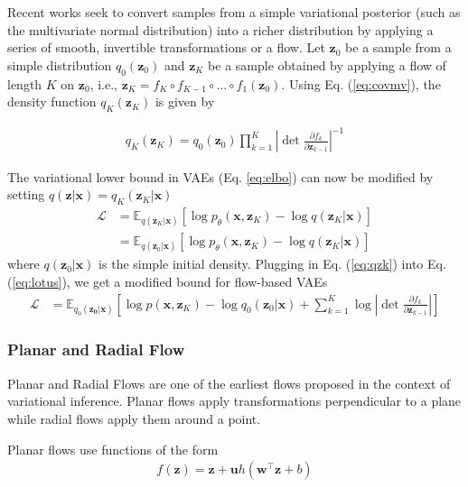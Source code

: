 \documentclass[runningheads]{llncs}
\begin{document}
Recent works seek to convert samples from a simple variational posterior (such as the multivariate normal distribution) into a richer distribution by applying a series of smooth, invertible transformations or a flow. Let $\mathbf{z}_0$ be a sample from a simple distribution $q_0(\mathbf{z}_0)$ and $\mathbf{z}_K$ be a sample obtained by applying a flow of length $K$ on $\mathbf{z}_0$, i.e., $\mathbf{z}_K = f_K \circ f_{K-1} \circ \dots \circ f_1 (\mathbf{z}_0)$. Using Eq. (\ref{eq:covmv}), the density function $q_K(\mathbf{z}_K)$ is given by

\begin{align}
q_K(\mathbf{z}_K) = q_0(\mathbf{z}_0)\prod_{k=1}^K\left|\det \frac{\partial f_k}{\partial \mathbf{z}_{k-1}}\right|^{-1}\label{eq:qzk}
\end{align}

The variational lower bound in VAEs (Eq. \ref{eq:elbo}) can now be modified by setting $q(\mathbf{z}|\mathbf{x}) = q_K(\mathbf{z}_K|\mathbf{x})$
\begin{align}
\mathcal{L} &= \mathbb{E}_{q(\mathbf{z}_K|\mathbf{x})}\left[\log p_\theta(\mathbf{x}, \mathbf{z}_K) - \log q(\mathbf{z}_K|\mathbf{x})\right]\\
&= \mathbb{E}_{q(\mathbf{z}_0|\mathbf{x})}\left[\log p_\theta(\mathbf{x}, \mathbf{z}_K) - \log q(\mathbf{z}_K|\mathbf{x})\right]\label{eq:lotus}
\end{align}
where $q(\mathbf{z}_0|\mathbf{x})$ is the simple initial density. Plugging in Eq. (\ref{eq:qzk}) into Eq. (\ref{eq:lotus}), we get a modified bound for flow-based VAEs
\begin{align}
\mathcal{L} &= \mathbb{E}_{q_0(\mathbf{z_0}|\mathbf{x})}\left[\log p(\mathbf{x},\mathbf{z}_K) - \log q_0(\mathbf{z}_0|\mathbf{x}) + \sum_{k=1}^K\log\left|\det \frac{\partial f_k}{\partial \mathbf{z}_{k-1}}\right| \right]
\end{align}
\subsubsection{Planar and Radial Flow} 
Planar and Radial Flows \cite{rezende2015variational} are one of the earliest flows proposed in the context of variational inference. Planar flows apply transformations perpendicular to a plane while radial flows apply them around a point. 

Planar flows use functions of the form
\begin{align}
f(\mathbf{z}) = \mathbf{z} + \mathbf{u}h(\mathbf{w}^\top\mathbf{z} + b)
\label{eq:planarfn}
\end{align}
\end{document}
